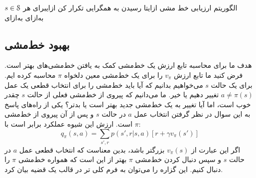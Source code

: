 {الگوریتم ارزیابی خط مشی}
‌ازای{تا رسیدن به همگرایی تکرار کن}
‌ازای{برای هر $s \in \EuScript{S}$}
‌به‌ازای
‌به‌ازای

% 
%

\subsection{بهبود خط‌مشی}

هدف ما برای محاسبه تابع ارزش یک خط‌مشی کمک به یافتن خط‌مشی‌های بهتر است.
فرض کنید ما تابع ارزش 
$v_{\pi}$
 را برای یک خط‌مشی معین  دلخواه 
 $\pi$
  محاسبه کرده ایم. برای یک حالت 
  $s$
 می‌خواهیم بدانیم که آیا باید خط‌مشی را برای انتخاب قطعی یک عمل 
 $a \neq \pi(s)$
  تغییر دهیم یا خیر.
ما می‌دانیم که پیروی از خط‌مشی فعلی از حالت
 $s$
  چقدر خوب است، اما آیا تغییر به یک خط‌مشی جدید بهتر است یا بدتر؟
  یکی از راه‌های پاسخ به این سوال در نظر گرفتن انتخاب عمل  
  $a$
در حالت 
$s$
و پس از آن پیروی از خط‌مشی
$\pi$
 است. 
 ارزش این شیوه عملکرد برابر است با:
$$q_\pi(s,a) = \sum_{s',r} p(s',r|s,a)\left[r + \gamma v_\pi(s')\right]$$
 اگر این عبارت از $v_\pi(s)$ بزرگتر باشد، بدین معناست که انتخاب قطعی عمل $a$ در حالت $s$ و سپس دنبال کردن خط‌مشی $\pi$ بهتر از این است که همواره خط‌مشی $\pi$ را دنبال کنیم. این گزاره را می‌توان به فرم کلی تر در قالب یک قضیه بیان کرد.

